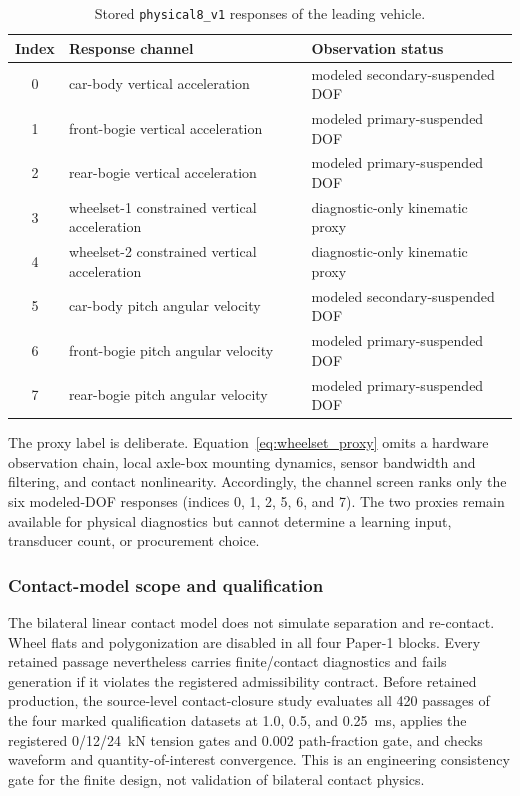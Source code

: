 \begin{table}[htbp]
\centering
\caption{Stored \texttt{physical8\_v1} responses of the leading vehicle.}
\label{tab:channels}
\small
\begin{tabular}{cll}
\toprule
Index & Response channel & Observation status \\
\midrule
0 & car-body vertical acceleration & modeled secondary-suspended DOF \\
1 & front-bogie vertical acceleration & modeled primary-suspended DOF \\
2 & rear-bogie vertical acceleration & modeled primary-suspended DOF \\
3 & wheelset-1 constrained vertical acceleration & diagnostic-only kinematic proxy \\
4 & wheelset-2 constrained vertical acceleration & diagnostic-only kinematic proxy \\
5 & car-body pitch angular velocity & modeled secondary-suspended DOF \\
6 & front-bogie pitch angular velocity & modeled primary-suspended DOF \\
7 & rear-bogie pitch angular velocity & modeled primary-suspended DOF \\
\bottomrule
\end{tabular}
\end{table}

The proxy label is deliberate. Equation~\eqref{eq:wheelset_proxy} omits a
hardware observation chain, local axle-box mounting dynamics, sensor bandwidth
and filtering, and contact nonlinearity. Accordingly, the channel screen ranks
only the six modeled-DOF responses (indices 0, 1, 2, 5, 6, and 7). The two
proxies remain available for physical diagnostics but cannot determine a
learning input, transducer count, or procurement choice.

\subsubsection{Contact-model scope and qualification}
\label{sec:contact}

The bilateral linear contact model does not simulate separation and re-contact.
Wheel flats and polygonization are disabled in all four Paper-1 blocks. Every
retained passage nevertheless carries finite/contact diagnostics and fails
generation if it violates the registered admissibility contract. Before
retained production, the source-level contact-closure study evaluates all 420
passages of the four
marked qualification datasets at 1.0, 0.5, and 0.25~ms, applies the registered
0/12/24~kN tension gates and 0.002 path-fraction gate, and checks waveform and
quantity-of-interest convergence. This is an engineering consistency gate for
the finite design, not validation of bilateral contact physics.

